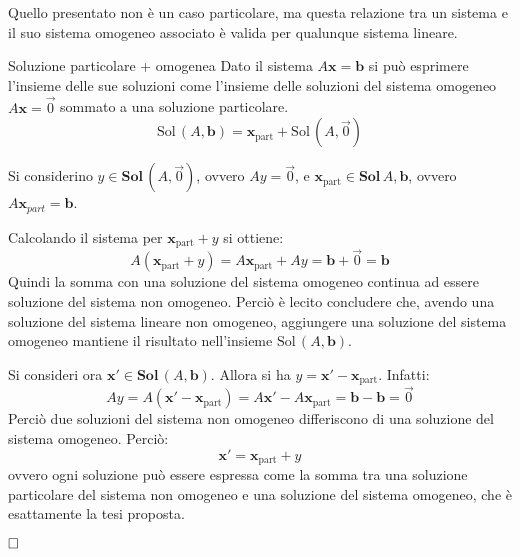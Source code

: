 Quello presentato non è un caso particolare, ma questa relazione tra un sistema e il suo sistema omogeneo associato è valida per qualunque sistema lineare.
\begin{teo}{Soluzione particolare + omogenea}
    Dato il sistema $A\textbf{x} = \textbf{b}$ si può esprimere l'insieme delle sue soluzioni come l'insieme delle soluzioni del sistema omogeneo $A\textbf{x} = \vec 0$ sommato a una soluzione particolare.
    \[
        \text{Sol}\,(A,\textbf{b}) = \textbf{x}_{\text{part}} + \text{Sol}\,(A,\vec 0)
    \]
\end{teo}
\begin{newdim}
    Si considerino $y \in \textbf{Sol}\,(A,\vec 0)$, ovvero $Ay = \vec 0$, e $\textbf{x}_\text{part} \in \textbf{Sol}\,{A,\textbf{b}}$, ovvero $A\textbf{x}_{part} = \textbf{b}$.

    Calcolando il sistema per $\textbf{x}_\text{part} + y$ si ottiene:
    \[
        A(\textbf{x}_\text{part} + y) = A\textbf{x}_\text{part} + Ay = \textbf{b} + \vec 0 = \textbf{b}
    \]
    Quindi la somma con una soluzione del sistema omogeneo continua ad essere soluzione del sistema non omogeneo. Perciò è lecito concludere che, avendo una soluzione del sistema lineare non omogeneo, aggiungere una soluzione del sistema omogeneo mantiene il risultato nell'insieme $\text{Sol}\,(A,\textbf{b})$.

    Si consideri ora $\textbf{x}' \in \textbf{Sol}\,(A,\textbf{b})$. Allora si ha $y = \textbf{x}' - \textbf{x}_\text{part}$. Infatti:
    \[
        Ay = A(\textbf{x}' - \textbf{x}_\text{part}) = A\textbf{x}' - A\textbf{x}_\text{part} = \textbf{b} - \textbf{b} = \vec 0
    \]
    Perciò due soluzioni del sistema non omogeneo differiscono di una soluzione del sistema omogeneo. Perciò:
    \[
        \textbf{x}' = \textbf{x}_\text{part} + y
    \]
    ovvero ogni soluzione può essere espressa come la somma tra una soluzione particolare del sistema non omogeneo e una soluzione del sistema omogeneo, che è esattamente la tesi proposta.
    
    $\hfill\qedwhite$
\end{newdim}